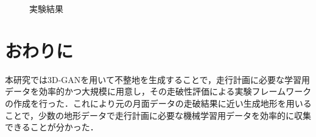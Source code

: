 \documentclass[a4paper,twocolumn,9pt]{jsarticle}
\begin{document}
\begin{figure}[b]
\begin{minipage}[b]{0.48\linewidth}
    \label{fig:result2}
  \end{minipage}
  \caption{実験結果}
\end{figure}


\section{おわりに}
本研究では3D-GANを用いて不整地を生成することで，走行計画に必要な学習用データを効率的かつ大規模に用意し，その走破性評価による実験フレームワークの作成を行った．これにより元の月面データの走破結果に近い生成地形を用いることで，少数の地形データで走行計画に必要な機械学習用データを効率的に収集できることが分かった．






\footnotesize %
\end{document}
